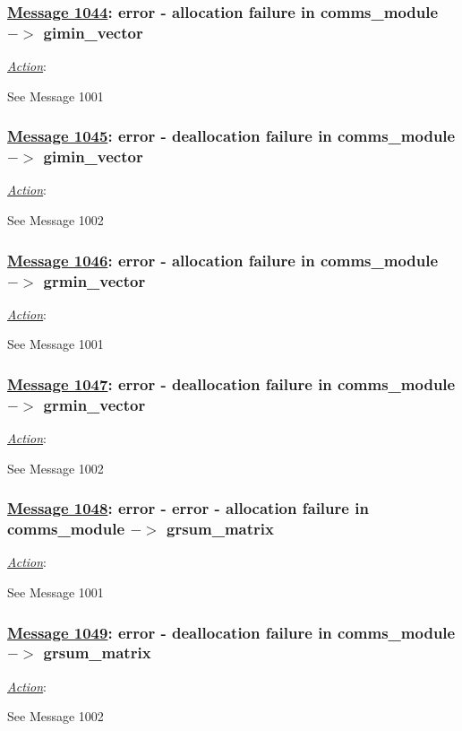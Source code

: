 \subsubsection*{\underline{Message 1044}: error - allocation failure in comms\_module $->$ gimin\_vector}

\noindent \underline{\em Action}:

See Message 1001

\subsubsection*{\underline{Message 1045}: error - deallocation failure in comms\_module $->$ gimin\_vector}

\noindent \underline{\em Action}:

See Message 1002

\subsubsection*{\underline{Message 1046}: error - allocation failure in comms\_module $->$ grmin\_vector}

\noindent \underline{\em Action}:

See Message 1001

\subsubsection*{\underline{Message 1047}: error - deallocation failure in comms\_module $->$ grmin\_vector}

\noindent \underline{\em Action}:

See Message 1002

\subsubsection*{\underline{Message 1048}: error - error - allocation failure in comms\_module $->$ grsum\_matrix}

\noindent \underline{\em Action}:

See Message 1001

\subsubsection*{\underline{Message 1049}: error - deallocation failure in comms\_module $->$ grsum\_matrix}

\noindent \underline{\em Action}:

See Message 1002

